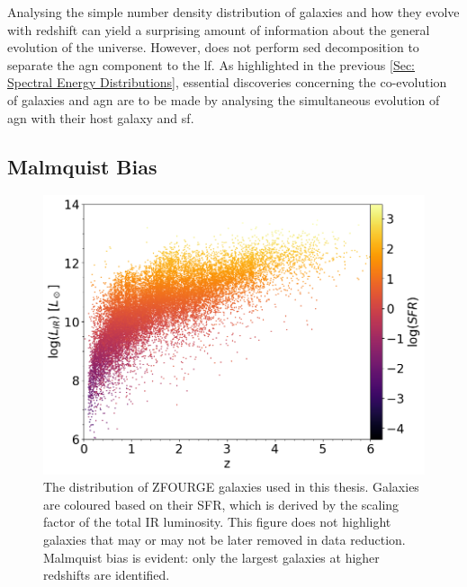 Analysing the simple number density distribution of galaxies and how they evolve with redshift can yield a surprising amount of information about the general evolution of the universe. However, \cite{gruppioni_herschel_2013} does not perform \gls{sed} decomposition to separate the \gls{agn} component to the \gls{lf}. As highlighted in the previous \cref{Sec: Spectral Energy Distributions}, essential discoveries concerning the co-evolution of galaxies and \gls{agn} are to be made by analysing the simultaneous evolution of \gls{agn} with their host galaxy and \gls{sf}. 

\subsection{Malmquist Bias}

\begin{figure}[h!]
    \centering
    \includegraphics[width=\textwidth]{Figures/ZFOURGE Initial Distribution.png}
    \caption{The distribution of ZFOURGE galaxies used in this thesis. Galaxies are coloured based on their SFR, which is derived by the \cite{kennicutt_global_1998} scaling factor of the total IR luminosity. This figure does not highlight galaxies that may or may not be later removed in data reduction. Malmquist bias is evident: only the largest galaxies at higher redshifts are identified.}
    \label{Fig: ZFOURGE Distribution}
\end{figure}

